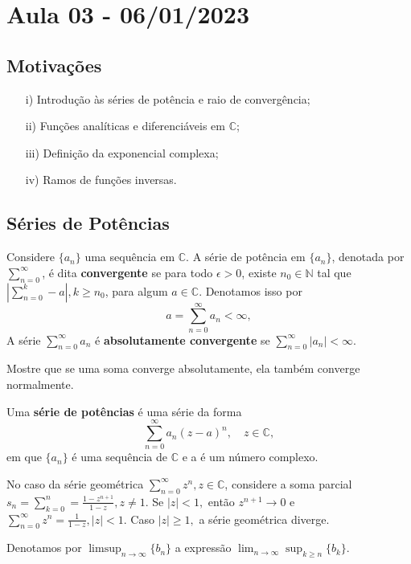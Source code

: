 \documentclass[complex.tex]{subfiles}
\begin{document}
\section{Aula 03 - 06/01/2023}
\subsection{Motivações}
\begin{itemize}
	\item[i)] Introdução às séries de potência e raio de convergência;
	\item[ii)] Funções analíticas e diferenciáveis em $\mathbb{C}$;
	\item[iii)] Definição da exponencial complexa;
	\item[iv)] Ramos de funções inversas.
\end{itemize}
\subsection{Séries de Potências}
\begin{def*}
	Considere $\{a_{n}\}$ uma sequência em $\mathbb{C}$. A série de potência em $\{a_n\}$, denotada
	por $\sum\limits_{n=0}^{\infty}$, é dita \textbf{convergente} se para todo $\epsilon > 0$, existe $n_0\in\mathbb{N}$
	tal que $|\sum\limits_{n=0}^{k} - a|, k\geq{n_0}$, para algum $a\in\mathbb{C}$. Denotamos isso por
	$$
		a = \sum_{n=0}^{\infty} a_n < \infty,
	$$
	A série $\sum\limits_{n=0}^{\infty}a_n$ é \textbf{absolutamente convergente} se $\sum\limits_{n=0}^{\infty}|a_n|<\infty$.
\end{def*}
\begin{exer*}
	Mostre que se uma soma converge absolutamente, ela também converge normalmente.
\end{exer*}
\begin{def*}
	Uma \textbf{série de potências} é uma série da forma
	$$
		\sum_{n=0}^{\infty}a_n(z-a)^n, \quad z\in\mathbb{C},
	$$
	em que $\{a_n\}$ é uma sequência de $\mathbb{C}$ e a é um número complexo.
\end{def*}
\begin{example}
	No caso da série geométrica $\sum\limits_{n=0}^{\infty}z^n, z\in\mathbb{C}$, considere
	a soma parcial $s_n = \sum\limits_{k=0}^{n} = \frac{1 - z^{n+1}}{1-z}, z\neq{1}.$ Se
	$|z| < 1,$ então $z^{n+1}\to{0}$ e $\sum\limits_{n=0}^{\infty}z^n = \frac{1}{1-z}, |z| < 1.$
	Caso $|z|\geq{1},$ a série geométrica diverge.
\end{example}
Denotamos por $\limsup_{n\to\infty}\{b_n\}$ a expressão $\lim_{n\to\infty}\sup_{k\geq{n}}\{b_k\}$.
\end{document}

